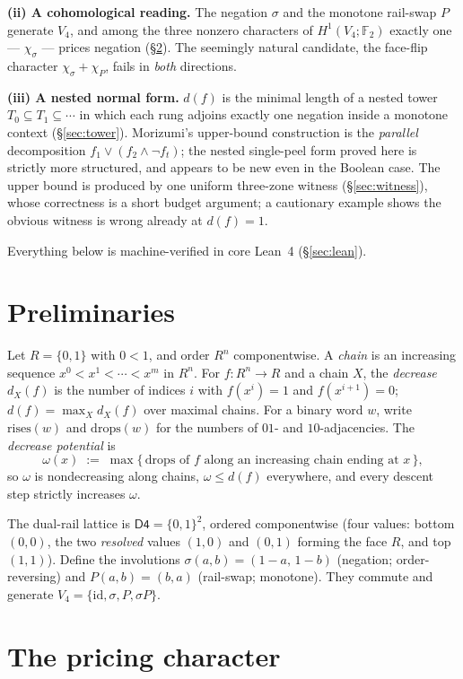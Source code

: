 \documentclass[11pt]{article}
\theoremstyle{remark}
\newcommand{\F}{\mathbb{F}}
\newcommand{\Dfour}{\mathsf{D4}}
\newcommand{\chis}{\chi_\sigma}
\newcommand{\chip}{\chi_P}
\begin{document}
\textbf{(ii) A cohomological reading.} The negation $\sigma$ and the
monotone rail-swap $P$ generate $V_4$, and among the three nonzero
characters of $H^1(V_4;\F_2)$ exactly one --- $\chis$ --- prices negation
(\S\ref{sec:char}). The seemingly natural candidate, the face-flip character
$\chis+\chip$, fails in \emph{both} directions.

\textbf{(iii) A nested normal form.} $d(f)$ is the minimal length of a
nested tower $T_0\subseteq T_1\subseteq\cdots$ in which each rung adjoins
exactly one negation inside a monotone context (\S\ref{sec:tower}).
Morizumi's upper-bound construction is the \emph{parallel} decomposition
$f_1\vee(f_2\wedge\neg f_t)$; the nested single-peel form proved here is
strictly more structured, and appears to be new even in the Boolean case.
The upper bound is produced by one uniform three-zone witness
(\S\ref{sec:witness}), whose correctness is a short budget argument; a
cautionary example shows the obvious witness is wrong already at $d(f)=1$.

Everything below is machine-verified in core Lean~4 (\S\ref{sec:lean}).

\section{Preliminaries}

Let $R=\{0,1\}$ with $0<1$, and order $R^n$ componentwise. A \emph{chain} is
an increasing sequence $x^0<x^1<\cdots<x^m$ in $R^n$. For $f:R^n\to R$ and a
chain $X$, the \emph{decrease} $d_X(f)$ is the number of indices $i$ with
$f(x^i)=1$ and $f(x^{i+1})=0$; $d(f)=\max_X d_X(f)$ over maximal chains. For
a binary word $w$, write $\mathrm{rises}(w)$ and $\mathrm{drops}(w)$ for the
numbers of $01$- and $10$-adjacencies. The \emph{decrease potential} is
\[
\omega(x)\;:=\;\max\{\,\text{drops of }f\text{ along an increasing chain
ending at }x\,\},
\]
so $\omega$ is nondecreasing along chains, $\omega\le d(f)$ everywhere, and
every descent step strictly increases $\omega$.

The dual-rail lattice is $\Dfour=\{0,1\}^2$, ordered componentwise (four
values: bottom $(0,0)$, the two \emph{resolved} values $(1,0)$ and $(0,1)$
forming the face $R$, and top $(1,1)$). Define the involutions
$\sigma(a,b)=(1-a,\,1-b)$ (negation; order-reversing) and $P(a,b)=(b,a)$
(rail-swap; monotone). They commute and generate
$V_4=\{\mathrm{id},\sigma,P,\sigma P\}$.

\section{The pricing character}\label{sec:char}
\end{document}

